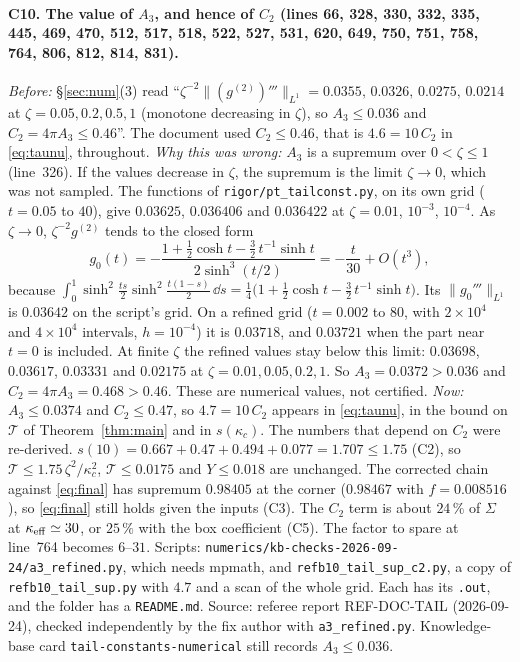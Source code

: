 \documentclass[11pt]{article}
\begin{document}
\paragraph{C10. The value of $A_3$, and hence of $C_2$ (lines 66, 328, 330, 332, 335, 445, 469, 470,
512, 517, 518, 522, 527, 531, 620, 649, 750, 751, 758, 764, 806, 812, 814, 831).}
\emph{Before:} \S\ref{sec:num}(3) read ``$\zeta^{-2}\|(g^{(2)})'''\|_{L^1}=0.0355,\,0.0326,\,0.0275,
\,0.0214$ at $\zeta=0.05,0.2,0.5,1$ (monotone decreasing in $\zeta$), so $A_3\le0.036$ and
$C_2=4\pi A_3\le0.46$''.  The document used $C_2\le0.46$, that is $4.6=10\,C_2$ in \eqref{eq:taunu},
throughout.
\emph{Why this was wrong:} $A_3$ is a supremum over $0<\zeta\le1$ (line~326).  If the values
decrease in $\zeta$, the supremum is the limit $\zeta\to0$, which was not sampled.  The functions of
\texttt{rigor/pt\_tailconst.py}, on its own grid ($t=0.05$ to $40$), give $0.03625$, $0.036406$ and
$0.036422$ at $\zeta=0.01$, $10^{-3}$, $10^{-4}$.  As $\zeta\to0$, $\zeta^{-2}g^{(2)}$ tends to the
closed form
\[
 g_0(t)=-\frac{1+\frac12\cosh t-\frac32\,t^{-1}\sinh t}{2\sinh^3(t/2)}=-\frac t{30}+O(t^3),
\]
because $\int_0^1\sinh^2\frac{ts}2\sinh^2\frac{t(1-s)}2\,\dd s=\frac14\bigl(1+\frac12\cosh t
-\frac32\,t^{-1}\sinh t\bigr)$.  Its $\|g_0'''\|_{L^1}$ is $0.03642$ on the script's grid.  On a
refined grid ($t=0.002$ to $80$, with $2\times10^4$ and $4\times10^4$ intervals, $h=10^{-4}$) it is
$0.03718$, and $0.03721$ when the part near $t=0$ is included.  At finite $\zeta$ the refined values
stay below this limit: $0.03698$, $0.03617$, $0.03331$ and $0.02175$ at $\zeta=0.01,0.05,0.2,1$.  So
$A_3=0.0372>0.036$ and $C_2=4\pi A_3=0.468>0.46$.  These are numerical values, not certified.
\emph{Now:} $A_3\le0.0374$ and $C_2\le0.47$, so $4.7=10\,C_2$ appears in \eqref{eq:taunu}, in the
bound on $\mathcal T$ of Theorem~\ref{thm:main} and in $s(\kappa_c)$.  The numbers that depend on
$C_2$ were re-derived.  $s(10)=0.667+0.47+0.494+0.077=1.707\le1.75$ (C2), so $\mathcal
T\le1.75\,\zeta^2/\kappa_c^2$, $\mathcal T\le0.0175$ and $Y\le0.018$ are unchanged.  The corrected
chain against \eqref{eq:final} has supremum $0.98405$ at the corner ($0.98467$ with $f=0.008516$), so
\eqref{eq:final} still holds given the inputs (C3).  The $C_2$ term is about $24\,\%$ of $\Sigma$
at $\kappa_{\rm eff}\simeq30$, or $25\,\%$ with the box coefficient (C5).  The factor to spare at
line~764 becomes $6$--$31$.  Scripts: \texttt{numerics/kb-checks-2026-09-24/a3\_refined.py}, which
needs mpmath, and \texttt{refb10\_tail\_sup\_c2.py}, a copy of \texttt{refb10\_tail\_sup.py} with
$4.7$ and a scan of the whole grid.  Each has its \texttt{.out}, and the folder has a
\texttt{README.md}.  Source: referee report REF-DOC-TAIL (2026-09-24), checked independently by the
fix author with \texttt{a3\_refined.py}.  Knowledge-base card \texttt{tail-constants-numerical} still
records $A_3\le0.036$.
\end{document}
